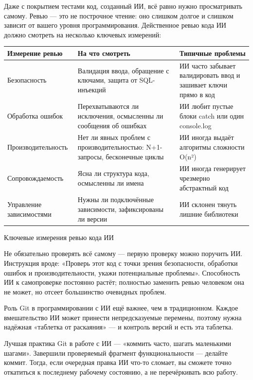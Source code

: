 
Даже с покрытием тестами код, созданный ИИ, всё равно нужно просматривать самому. Ревью — это не построчное чтение: оно слишком долгое и слишком зависит от вашего уровня программирования. Действенное ревью кода ИИ должно смотреть на несколько ключевых измерений:

\begin{center}
\begin{tabularx}{\linewidth}{|X|X|X|}
\hline
\textbf{Измерение ревью} & \textbf{На что смотреть} & \textbf{Типичные проблемы} \tabularnewline
\hline
Безопасность & Валидация ввода, обращение с ключами, защита от SQL-инъекций & ИИ часто забывает валидировать ввод и зашивает ключи прямо в код \tabularnewline
Обработка ошибок & Перехватываются ли исключения, осмысленны ли сообщения об ошибках & ИИ любит пустые блоки catch или один console.log \tabularnewline
Производительность & Нет ли явных проблем с производительностью: N+1-запросы, бесконечные циклы & ИИ иногда выдаёт алгоритмы сложности O(n²) \tabularnewline
Сопровождаемость & Ясна ли структура кода, осмысленны ли имена & ИИ иногда генерирует чрезмерно абстрактный код \tabularnewline
Управление зависимостями & Нужны ли подключённые зависимости, зафиксированы ли версии & ИИ склонен тянуть лишние библиотеки \tabularnewline
\hline
\end{tabularx}
\end{center}

\begin{center}\small\color{gray}Ключевые измерения ревью кода ИИ\end{center}

Не обязательно проверять всё самому — первую проверку можно поручить ИИ. Инструкция вроде: «Проверь этот код с точки зрения безопасности, обработки ошибок и производительности, укажи потенциальные проблемы». Способность ИИ к самопроверке постоянно растёт; полностью заменить ревью человеком она не может, но отсеет большинство очевидных проблем.


Роль Git в программировании с ИИ ещё важнее, чем в традиционном. Каждое вмешательство ИИ может принести непредсказуемые перемены, поэтому нужна надёжная «таблетка от раскаяния» — и контроль версий и есть эта таблетка.

Лучшая практика Git в работе с ИИ — «коммить часто, шагать маленькими шагами». Завершили проверяемый фрагмент функциональности — делайте коммит. Тогда, если очередная правка ИИ что-то сломает, вы сможете точно откатиться к последнему рабочему состоянию, а не перечёркивать всю работу.

